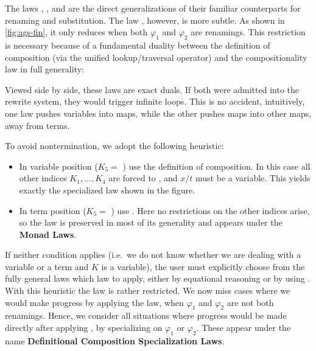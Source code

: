 \documentclass[screen,nonacm]{acmart}
\begin{document}
The laws , , and  are
the direct generalizations of their familiar counterparts for renaming and
substitution. The law , however, is more subtle. As shown in
\cref{fig:ags-fin}, it only reduces when both $\varphi_1$ and $\varphi_2$ are
renamings. This restriction is necessary because of a fundamental duality
between the definition of composition (via the unified lookup/traversal
operator) and the compositionality law in full generality:

\begin{minipage}{0.45\linewidth}
      \raggedright{}
      \ECompGeneral{}
\end{minipage}
\begin{minipage}{0.55\linewidth}
      \raggedright{}
      \ECompoGeneral{}
\end{minipage}

\noindent Viewed side by side, these laws are exact duals. If both were admitted into the
rewrite system, they would trigger infinite loops. This is no accident,
intuitively, one law pushes variables into maps, while the other pushes maps
into other maps, away from terms.

To avoid nontermination, we adopt the following heuristic:
\begin{itemize}
      \item In variable position ($K_5 = $ ) use the definition of
            composition. In this case all other indices $K_1,\dots,K_4$ are forced to
            , and $x/t$ must be a variable. This yields exactly the
            specialized  law shown in the figure.
      \item In term position ($K_5 = $ ) use .
            Here no restrictions on the other indices arise, so the law is preserved in
            most of its generality and appears under the \textbf{Monad Laws}.
\end{itemize}

\noindent If neither condition applies (i.e.\ we do not know whether we are dealing with
a variable or a term and $K$ is a variable), the user must explicitly choose from the fully general laws which law to apply,
either by equational reasoning or by using . With this heuristic the  law is rather restricted. We now
miss cases where we would make progress by applying the  law, when $\varphi_1$
and $\varphi_2$ are not both renamings. Hence, we consider all situations where
progress would be made directly after applying , by
specializing on $\varphi_1$ or $\varphi_2$. These appear under the name
\textbf{Definitional Composition Specialization Laws}.
\end{document}
